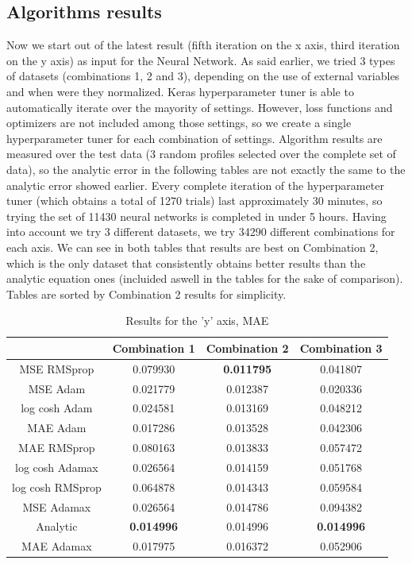 \documentclass[openany]{article}
\begin{document}
\newpage 

\subsection{Algorithms results}

Now we start out of the latest result (fifth iteration on the x axis, third iteration on the y axis) as input for the Neural Network. As said earlier, we tried 3 types of datasets (combinations 1, 2 and 3), depending on the use of external variables and when were they normalized. Keras hyperparameter tuner is able to automatically iterate over the mayority of settings. However, loss functions and optimizers are not included among those settings, so we create a single hyperparameter tuner for each combination of settings. Algorithm results are measured over the test data (3 random profiles selected over the complete set of data), so the analytic error in the following tables are not exactly the same to the analytic error showed earlier. Every complete iteration of the hyperparameter tuner (which obtains a total of 1270 trials) last approximately 30 minutes, so trying the set of 11430 neural networks is completed in under 5 hours. Having into account we try 3 different datasets, we try 34290 different combinations for each axis. We can see in both tables that results are best on Combination 2, which is the only dataset that consistently obtains better results than the analytic equation ones (incluided aswell in the tables for the sake of comparison). Tables are sorted by Combination 2 results for simplicity.


\begin{table}[!h]
    \centering
    \begin{tabular}{c|c|c|c}
\textbf{}  & \textbf{Combination 1} &	\textbf{Combination 2} & \textbf{Combination 3}  \\
\hline
MSE RMSprop &  0.079930 &	\textbf{0.011795} & 0.041807 \\
MSE Adam & 0.021779 &	0.012387 & 0.020336 \\
log cosh Adam & 0.024581 &	0.013169 & 0.048212 \\
MAE Adam & 0.017286 &	0.013528 & 0.042306 \\
MAE RMSprop & 0.080163 &	0.013833 & 0.057472 \\
log cosh Adamax & 0.026564 &	0.014159 & 0.051768 \\
log cosh RMSprop & 0.064878 &	0.014343 & 0.059584 \\
MSE Adamax & 0.026564 &	0.014786 & 0.094382 \\
Analytic & \textbf{0.014996} &	0.014996 & \textbf{0.014996}  \\
MAE Adamax & 0.017975 &	0.016372 & 0.052906 \\
\hline 
    \end{tabular}
    \caption{Results for the 'y' axis, MAE}
    \label{tab:my_label}
\end{table}
\end{document}
